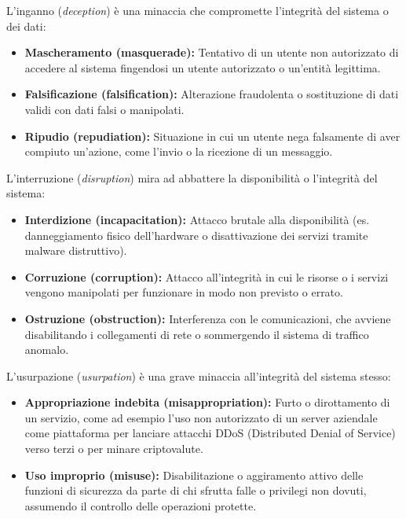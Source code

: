 \begin{warnbox}[2. Inganno]
L'inganno (\textit{deception}) è una minaccia che compromette l'integrità del sistema o dei dati:
\begin{itemize}
    \item \textbf{Mascheramento (masquerade):} Tentativo di un utente non autorizzato di accedere al sistema fingendosi un utente autorizzato o un'entità legittima.
    \item \textbf{Falsificazione (falsification):} Alterazione fraudolenta o sostituzione di dati validi con dati falsi o manipolati.
    \item \textbf{Ripudio (repudiation):} Situazione in cui un utente nega falsamente di aver compiuto un'azione, come l'invio o la ricezione di un messaggio.
\end{itemize}
\end{warnbox}

\begin{warnbox}[3. Interruzione]
L'interruzione (\textit{disruption}) mira ad abbattere la disponibilità o l'integrità del sistema:
\begin{itemize}
    \item \textbf{Interdizione (incapacitation):} Attacco brutale alla disponibilità (es. danneggiamento fisico dell'hardware o disattivazione dei servizi tramite malware distruttivo).
    \item \textbf{Corruzione (corruption):} Attacco all'integrità in cui le risorse o i servizi vengono manipolati per funzionare in modo non previsto o errato.
    \item \textbf{Ostruzione (obstruction):} Interferenza con le comunicazioni, che avviene disabilitando i collegamenti di rete o sommergendo il sistema di traffico anomalo.
\end{itemize}
\end{warnbox}

\begin{warnbox}[4. Usurpazione]
L'usurpazione (\textit{usurpation}) è una grave minaccia all'integrità del sistema stesso:
\begin{itemize}
    \item \textbf{Appropriazione indebita (misappropriation):} Furto o dirottamento di un servizio, come ad esempio l'uso non autorizzato di un server aziendale come piattaforma per lanciare attacchi DDoS (Distributed Denial of Service) verso terzi o per minare criptovalute.
    \item \textbf{Uso improprio (misuse):} Disabilitazione o aggiramento attivo delle funzioni di sicurezza da parte di chi sfrutta falle o privilegi non dovuti, assumendo il controllo delle operazioni protette.
\end{itemize}
\end{warnbox}

